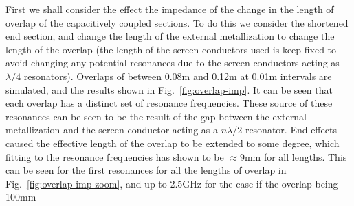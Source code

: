 First we shall consider the effect the impedance of the change in the length of overlap of the capacitively coupled sections. To do this we consider the shortened end section, and change the length of the external metallization to change the length of the overlap (the length of the screen conductors used is keep fixed to avoid changing any potential resonances due to the screen conductors acting as $\lambda /4$ resonators). Overlaps of between 0.08m and 0.12m at 0.01m intervals are simulated, and the results shown in Fig.~\ref{fig:overlap-imp}. It can be seen that each overlap has a distinct set of resonance frequencies. These source of these resonances can be seen to be the result of the gap between the external metallization and the screen conductor acting as a $n \lambda /2$ resonator. End effects caused the effective length of the overlap to be extended to some degree, which fitting to the resonance frequencies has shown to be $\approx 9$mm for all lengths. This can be seen for the first resonances for all the lengths of overlap in Fig.~\ref{fig:overlap-imp-zoom}, and up to 2.5GHz for the case if the overlap being 100mm

\begin{figure}
\subfigure[]{
\label{fig:overlap-imp}
}
\subfigure[]{
\label{fig:overlap-imp-zoom}
}
\end{figure}